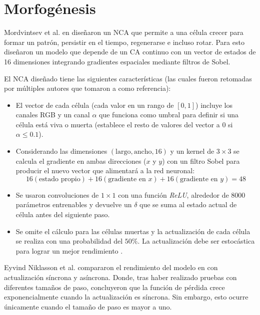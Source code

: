 \section{Morfogénesis}

Mordvintsev et al. en \cite{mordvintsevNCA} diseñaron un NCA que permite a una célula crecer para formar un patrón, persistir en el tiempo, regenerarse e incluso rotar. Para esto diseñaron un modelo que depende de un CA continuo con un vector de estados de 16 dimensiones integrando gradientes espaciales mediante filtros de Sobel. 

El NCA diseñado tiene las siguientes características (las cuales fueron retomadas por múltiples autores que tomaron a \cite{mordvintsevNCA} como referencia):
 \begin{itemize}
 	\item El vector de cada célula (cada valor en un rango de $[0,1]$)  incluye los canales RGB y un canal $\alpha$ que funciona como umbral para definir si una célula está viva o muerta (establece el resto de valores del vector a $0$ si $\alpha \leq 0.1$). 
 	
 	\item Considerando las dimensiones $(\text{largo}, \text{ancho}, 16)$ y un kernel de $3 \times 3$ se calcula el gradiente en ambas direcciones ($x$ y $y$) con un filtro Sobel para producir el nuevo vector que alimentará a la red neuronal:
 	\[ 
 	16 (\text{estado propio}) + 16 (\text{gradiente en } x) + 16 (\text{gradiente en } y) = 48 
 	\]
 	
 	\item Se usaron convoluciones de $1 \times 1$ con una función \textit{ReLU}, alrededor de $8000$ parámetros entrenables y devuelve un $\delta$ que se suma al estado actual de célula antes del siguiente paso. 
 	
 	\item Se omite el cálculo para las células muertas y la actualización de cada célula se realiza con una probabilidad del $50\%$. La actualización debe ser estocástica para lograr un mejor rendimiento \cite{NiklassonNCA}. 
 \end{itemize}

Eyvind Niklasson et al. \cite{NiklassonNCA} compararon el rendimiento del modelo en \cite{mordvintsevNCA} con actualización síncrona y asíncrona. Donde, tras haber realizado pruebas con diferentes tamaños de paso, concluyeron que la función de pérdida crece exponencialmente cuando la actualización es síncrona. Sin embargo, esto ocurre únicamente cuando el tamaño de paso es mayor a uno.

